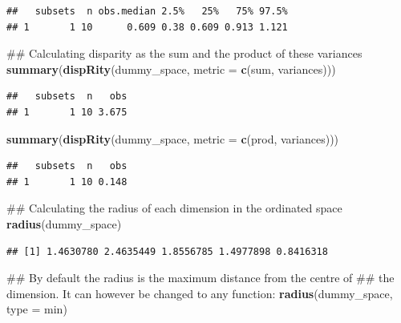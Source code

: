 \documentclass[]{book}
\newenvironment{Shaded}{\begin{snugshade}}{\end{snugshade}}
\newcommand{\KeywordTok}[1]{\textcolor[rgb]{0.13,0.29,0.53}{\textbf{#1}}}
\newcommand{\DataTypeTok}[1]{\textcolor[rgb]{0.13,0.29,0.53}{#1}}
\newcommand{\NormalTok}[1]{#1}
\theoremstyle{definition}
\theoremstyle{definition}
\theoremstyle{definition}
\theoremstyle{remark}
\begin{document}
\begin{verbatim}
##   subsets  n obs.median 2.5%   25%   75% 97.5%
## 1       1 10      0.609 0.38 0.609 0.913 1.121
\end{verbatim}

\begin{Shaded}
\begin{Highlighting}[]
\NormalTok{## Calculating disparity as the sum and the product of these variances}
\KeywordTok{summary}\NormalTok{(}\KeywordTok{dispRity}\NormalTok{(dummy_space, }\DataTypeTok{metric =} \KeywordTok{c}\NormalTok{(sum, variances)))}
\end{Highlighting}
\end{Shaded}

\begin{verbatim}
##   subsets  n   obs
## 1       1 10 3.675
\end{verbatim}

\begin{Shaded}
\begin{Highlighting}[]
\KeywordTok{summary}\NormalTok{(}\KeywordTok{dispRity}\NormalTok{(dummy_space, }\DataTypeTok{metric =} \KeywordTok{c}\NormalTok{(prod, variances)))}
\end{Highlighting}
\end{Shaded}

\begin{verbatim}
##   subsets  n   obs
## 1       1 10 0.148
\end{verbatim}

\begin{Shaded}
\begin{Highlighting}[]
\NormalTok{## Calculating the radius of each dimension in the ordinated space}
\KeywordTok{radius}\NormalTok{(dummy_space)}
\end{Highlighting}
\end{Shaded}

\begin{verbatim}
## [1] 1.4630780 2.4635449 1.8556785 1.4977898 0.8416318
\end{verbatim}

\begin{Shaded}
\begin{Highlighting}[]
\NormalTok{## By default the radius is the maximum distance from the centre of}
\NormalTok{## the dimension. It can however be changed to any function:}
\KeywordTok{radius}\NormalTok{(dummy_space, }\DataTypeTok{type =}\NormalTok{ min)}
\end{Highlighting}
\end{Shaded}
\end{document}
